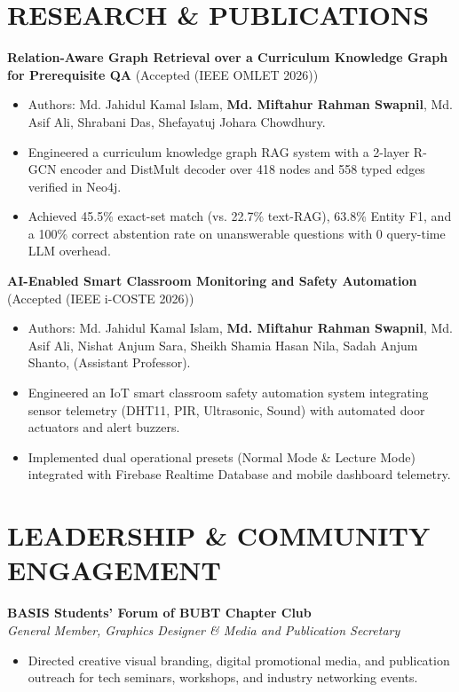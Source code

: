 \documentclass[10pt, a4paper]{article}
\begin{document}
\section{RESEARCH \& PUBLICATIONS}
\vspace{-2pt}
\textbf{Relation-Aware Graph Retrieval over a Curriculum Knowledge Graph for Prerequisite QA} (Accepted (IEEE OMLET 2026))
\begin{itemize}[leftmargin=0.18in, label=\textbullet, itemsep=1pt, topsep=2pt]
  \small
  \item Authors: Md. Jahidul Kamal Islam, \textbf{Md. Miftahur Rahman Swapnil}, Md. Asif Ali, Shrabani Das, Shefayatuj Johara Chowdhury.
  \item Engineered a curriculum knowledge graph RAG system with a 2-layer R-GCN encoder and DistMult decoder over 418 nodes and 558 typed edges verified in Neo4j.
  \item Achieved 45.5\% exact-set match (vs. 22.7\% text-RAG), 63.8\% Entity F1, and a 100\% correct abstention rate on unanswerable questions with 0 query-time LLM overhead.
\end{itemize}
\vspace{3pt}

\textbf{AI-Enabled Smart Classroom Monitoring and Safety Automation} (Accepted (IEEE i-COSTE 2026))
\begin{itemize}[leftmargin=0.18in, label=\textbullet, itemsep=1pt, topsep=2pt]
  \small
  \item Authors: Md. Jahidul Kamal Islam, \textbf{Md. Miftahur Rahman Swapnil}, Md. Asif Ali, Nishat Anjum Sara, Sheikh Shamia Hasan Nila, Sadah Anjum Shanto, (Assistant Professor).
  \item Engineered an IoT smart classroom safety automation system integrating sensor telemetry (DHT11, PIR, Ultrasonic, Sound) with automated door actuators and alert buzzers.
  \item Implemented dual operational presets (Normal Mode \& Lecture Mode) integrated with Firebase Realtime Database and mobile dashboard telemetry.
\end{itemize}

\section{LEADERSHIP \& COMMUNITY ENGAGEMENT}
\vspace{-2pt}
\textbf{BASIS Students' Forum of BUBT Chapter Club} \\
\textit{\small General Member, Graphics Designer \& Media and Publication Secretary}
\begin{itemize}[leftmargin=0.18in, label=\textbullet, itemsep=1pt, topsep=2pt]
  \small
  \item Directed creative visual branding, digital promotional media, and publication outreach for tech seminars, workshops, and industry networking events.
\end{itemize}
\end{document}
